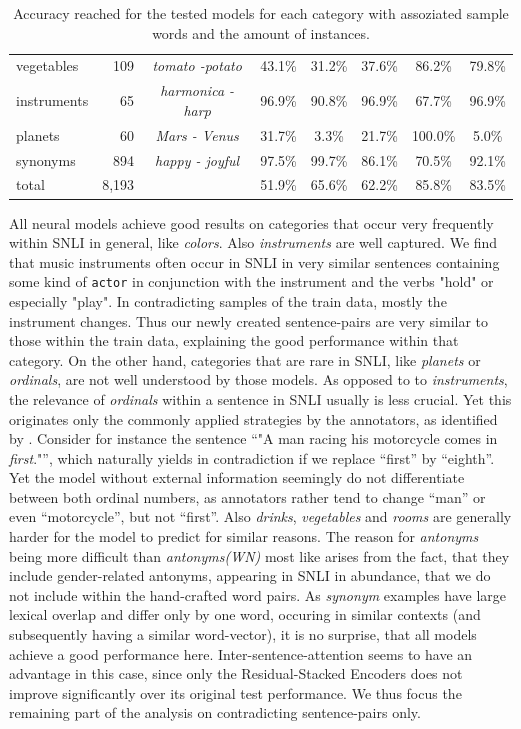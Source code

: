 \begin{table}[tph!]
{\begin{tabular}{lrc|ccccc}
vegetables & 109 & \textit{tomato -potato} & 43.1\% &31.2\% & 37.6\% & 86.2\% & 79.8\% \\ 
instruments & 65 & \textit{harmonica - harp} & 96.9\% &90.8\% & 96.9\% & 67.7\% & 96.9\% \\ 
planets & 60 & \textit{Mars - Venus} & 31.7\% & 3.3\%& 21.7\% & 100.0\% & 5.0\% \\ 
\midrule
synonyms & 894 & \textit{happy - joyful} & 97.5\% & 99.7\% & 86.1\% & 70.5\% & 92.1\% \\ 
\midrule
total & 8,193 &  & 51.9\% &65.6\% & 62.2\% & 85.8\% & 83.5\% \\ 
\bottomrule
\end{tabular}}
\caption{Accuracy reached for the tested models for each category with assoziated sample words and the amount of instances.}
\label{tab:acc_by_cat}
\end{table}
All neural models achieve good results on categories that occur very frequently within \ac{SNLI} in general, like \textit{colors}. Also \textit{instruments} are well captured. We find that music instruments often occur in SNLI in very similar sentences containing some kind of \texttt{actor} in conjunction with the instrument and the verbs "hold" or especially "play". In contradicting samples of the train data, mostly the instrument changes. Thus our newly created sentence-pairs are very similar to those within the train data, explaining the good performance within that category. On the other hand, categories that are rare in \ac{SNLI}, like \textit{planets} or \textit{ordinals}, are not well understood by those models. As opposed to to \textit{instruments}, the relevance of \textit{ordinals} within a sentence in \ac{SNLI} usually is less crucial. Yet this originates only the commonly applied strategies by the annotators, as identified by \cite{gururangan2018annotation}. Consider for instance the sentence ``"A man racing his motorcycle comes in \textit{first}."'', which naturally yields in contradiction if we replace ``first'' by ``eighth''. Yet the model without external information seemingly do not differentiate between both ordinal numbers, as annotators rather tend to change ``man'' or even ``motorcycle'', but not ``first''. Also \textit{drinks}, \textit{vegetables} and \textit{rooms} are generally harder for the model to predict for similar reasons. The reason for \textit{antonyms} being more difficult than \textit{antonyms(WN)} most like arises from the fact, that they include gender-related antonyms, appearing in SNLI in abundance, that we do not include within the hand-crafted word pairs. As \textit{synonym} examples have large lexical overlap and differ only by one word, occuring in similar contexts (and subsequently having a similar word-vector), it is no surprise, that all models achieve a good performance here. Inter-sentence-attention seems to have an advantage in this case, since only the Residual-Stacked Encoders does not improve significantly over its original test performance. We thus focus the remaining part of the analysis on contradicting sentence-pairs only.

